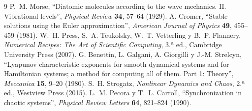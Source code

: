 \documentclass[12pt,a4paper]{article}
\begin{document}
\begin{thebibliography}{9}
 P.~M. Morse, ``Diatomic molecules according to the wave mechanics. II. Vibrational levels'', \textit{Physical Review} \textbf{34}, 57--64 (1929).
 A. Cromer, ``Stable solutions using the Euler approximation'', \textit{American Journal of Physics} \textbf{49}, 455--459 (1981).
 W.~H. Press, S.~A. Teukolsky, W.~T. Vetterling y B.~P. Flannery, \textit{Numerical Recipes: The Art of Scientific Computing}, 3.ª ed., Cambridge University Press (2007).
 G. Benettin, L. Galgani, A. Giorgilli y J.-M. Strelcyn, ``Lyapunov characteristic exponents for smooth dynamical systems and for Hamiltonian systems; a method for computing all of them. Part 1: Theory'', \textit{Meccanica} \textbf{15}, 9--20 (1980).
 S.~H. Strogatz, \textit{Nonlinear Dynamics and Chaos}, 2.ª ed., Westview Press (2015).
 L.~M. Pecora y T.~L. Carroll, ``Synchronization in chaotic systems'', \textit{Physical Review Letters} \textbf{64}, 821--824 (1990).
\end{thebibliography}
\end{document}
